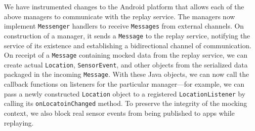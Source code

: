 We have instrumented changes to the Android platform that allows each of the
above managers to communicate with the \PocketMocker{} replay service. The
managers now implement \texttt{Messenger} handlers to receive
\texttt{Messages} from external channels. On construction of a manager, it
sends a \texttt{Message} to the replay service, notifying the service of its
existence and establishing a bidirectional channel of communication. On
receipt of a \texttt{Message} containing mocked data from the replay service,
we can create actual \texttt{Location}, \texttt{SensorEvent}, and other
objects from the serialized data packaged in the incoming \texttt{Message}.
With these Java objects, we can now call the callback functions on listeners
for the particular manager---for example, we can pass a newly constructed
\texttt{Location} object to a registered \texttt{LocationListener} by calling
its \texttt{onLocatoinChanged} method. To preserve the integrity of the
mocking context, we also block real sensor events from being published to
apps while replaying.

